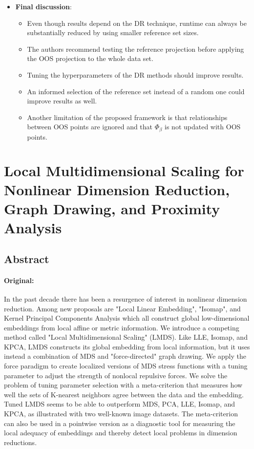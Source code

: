 \documentclass[a4paper,12pt]{article}
\begin{document}
\begin{itemize}
    \item \textbf{Final discussion}:
    \begin{itemize}
        \item Even though results depend on the DR technique, runtime can always be substantially reduced by using smaller reference set sizes.
        \item The authors recommend testing the reference projection before applying the OOS projection to the whole data set.
        \item Tuning the hyperparameters of the DR methods should improve results.
        \item An informed selection of the reference set instead of a random one could improve results as well.
        \item Another limitation of the proposed framework is that relationships between OOS points are ignored and that $\Phi_{\beta}$ is not updated with OOS points.
    \end{itemize}
\end{itemize}


\pagebreak
\section{Local Multidimensional Scaling for Nonlinear Dimension Reduction, Graph Drawing, and Proximity Analysis \texorpdfstring{\cite{Chen01032009}}{}}
\label{sec:LocalMDS}

\subsection{Abstract}

\paragraph{Original:} In the past decade there has been a resurgence of interest in nonlinear dimension reduction. Among new proposals are "Local Linear Embedding", "Isomap", and Kernel Principal Components Analysis which all construct global low-dimensional embeddings from local affine or metric information. We introduce a competing method called "Local Multidimensional Scaling" (LMDS). Like LLE, Isomap, and KPCA, LMDS constructs its global embedding from local information, but it uses instead a combination of MDS and "force-directed" graph drawing. We apply the force paradigm to create localized versions of MDS stress functions with a tuning parameter to adjust the strength of nonlocal repulsive forces. We solve the problem of tuning parameter selection with a meta-criterion that measures how well the sets of K-nearest neighbors agree between the data and the embedding. Tuned LMDS seems to be able to outperform MDS, PCA, LLE, Isomap, and KPCA, as illustrated with two well-known image datasets. The meta-criterion can also be used in a pointwise version as a diagnostic tool for measuring the local adequacy of embeddings and thereby detect local problems in dimension reductions.
\end{document}
